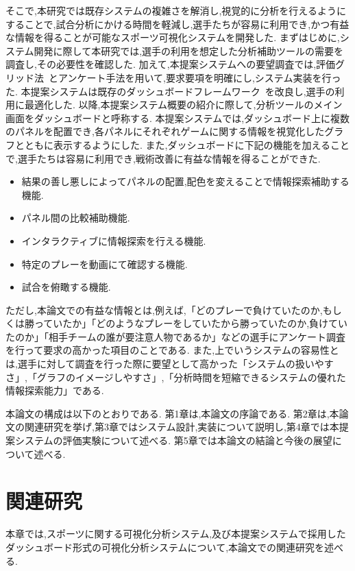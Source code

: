 \documentclass[sotsuron]{kuee}
\begin{document}
	そこで,本研究では既存システムの複雑さを解消し,視覚的に分析を行えるようにすることで,試合分析にかける時間を軽減し,選手たちが容易に利用でき,かつ有益な情報を得ることが可能なスポーツ可視化システムを開発した.  
	まずはじめに,システム開発に際して本研究では,選手の利用を想定した分析補助ツールの需要を調査し,その必要性を確認した.  
	加えて,本提案システムへの要望調査では,評価グリッド法~\cite{EGM}とアンケート手法を用いて,要求要項を明確にし,システム実装を行った.  
	本提案システムは既存のダッシュボードフレームワーク~\cite{dashboard}を改良し,選手の利用に最適化した.  
	以降,本提案システム概要の紹介に際して,分析ツールのメイン画面をダッシュボードと呼称する.  
	本提案システムでは,ダッシュボード上に複数のパネルを配置でき,各パネルにそれぞれゲームに関する情報を視覚化したグラフとともに表示するようにした.  
	また,ダッシュボードに下記の機能を加えることで,選手たちは容易に利用でき,戦術改善に有益な情報を得ることができた.  
		\begin{itemize}
			\item 結果の善し悪しによってパネルの配置,配色を変えることで情報探索補助する機能.  
			\item パネル間の比較補助機能.  
			\item インタラクティブに情報探索を行える機能.  
			\item 特定のプレーを動画にて確認する機能.  
			\item 試合を俯瞰する機能.  
		\end{itemize}
	ただし,本論文での有益な情報とは,例えば,「どのプレーで負けていたのか,もしくは勝っていたか」「どのようなプレーをしていたから勝っていたのか,負けていたのか」「相手チームの誰が要注意人物であるか」などの選手にアンケート調査を行って要求の高かった項目のことである.  
	また,上でいうシステムの容易性とは,選手に対して調査を行った際に要望として高かった「システムの扱いやすさ」,「グラフのイメージしやすさ」,「分析時間を短縮できるシステムの優れた情報探索能力」である.  
	
	本論文の構成は以下のとおりである.  
	第1章は,本論文の序論である.  第2章は,本論文の関連研究を挙げ,第3章ではシステム設計,実装について説明し,第4章では本提案システムの評価実験について述べる.  
	第5章では本論文の結論と今後の展望について述べる.  

\chapter{関連研究}
	本章では,スポーツに関する可視化分析システム,及び本提案システムで採用したダッシュボード形式の可視化分析システムについて,本論文での関連研究を述べる.  
	
\end{document}
